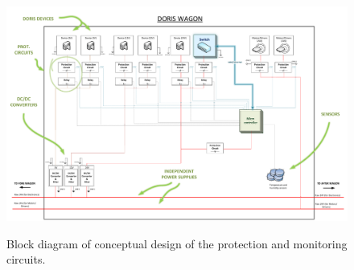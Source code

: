 \begin{figure}
  \centering
  \includegraphics[width=1\columnwidth]{figs/tables/WagonPowerSupply.pdf}\\
  \caption[Block diagram of conceptual design of the protection and monitoring circuits]{Block diagram of conceptual design of the protection and monitoring circuits.}
  \label{FIG:SUPCIRPROT2}
\end{figure}
